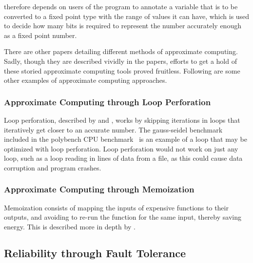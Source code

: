 \taffo{} therefore depends on users of the program to annotate a variable that is to be converted to a fixed point type with the range of values it can have, which is used to decide how many bits is required to represent the number accurately enough as a fixed point number. 


There are other papers detailing different methods of approximate computing. Sadly, though they are described vividly in the papers, efforts to get a hold of these storied approximate computing tools proved fruitless. Following are some other examples of approximate computing approaches.

\subsubsection{Approximate Computing through Loop Perforation}

Loop perforation, described by \citet{li2018sculptor} and \citet{baek2010green}, works by skipping iterations in loops that iteratively get closer to an accurate number. The gauss-seidel benchmark included in the polybench CPU benchmark~\citep{polybench} is an example of a loop that may be optimized with loop perforation. Loop perforation would not work on just any loop, such as a loop reading in lines of data from a file, as this could cause data corruption and program crashes.

\subsubsection{Approximate Computing through Memoization}

Memoization consists of mapping the inputs of expensive functions to their outputs, and avoiding to re-run the function for the same input, thereby saving energy. This is described more in depth by \citet{mittal2016survey}.


\subsection{Reliability through Fault Tolerance}
\label{section:Reliability_thorugh_fault_tolerance}

